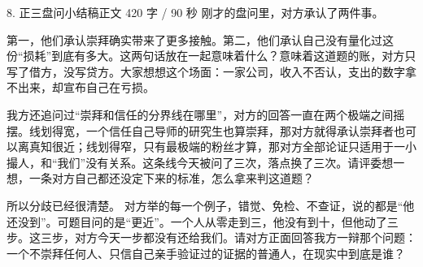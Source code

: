 \documentclass[script,pro]{debate}
\begin{document}
\begin{speech}{8. 正三盘问小结稿}{正文 420 字 / 90 秒}
刚才的盘问里，对方承认了两件事。

第一，他们承认崇拜确实带来了更多接触。第二，他们承认自己没有量化过这份“损耗”到底有多大。这两句话放在一起意味着什么？意味着这道题的账，对方只写了借方，没写贷方。大家想想这个场面：一家公司，收入不否认，支出的数字拿不出来，却宣布自己在亏损。

我方还追问过“崇拜和信任的分界线在哪里”，对方的回答一直在两个极端之间摇摆。线划得宽，一个信任自己导师的研究生也算崇拜，那对方就得承认崇拜者也可以离真知很近；线划得窄，只有最极端的粉丝才算，那对方全部论证只适用于一小撮人，和“我们”没有关系。这条线今天被问了三次，落点换了三次。请评委想一想，一条对方自己都还没定下来的标准，怎么拿来判这道题？

所以分歧已经很清楚。 对方举的每一个例子，错觉、免检、不查证，说的都是“他还没到”。可题目问的是“更近”。一个人从零走到三，他没有到十，但他动了三步。这三步，对方今天一步都没有还给我们。请对方正面回答我方一辩那个问题：一个不崇拜任何人、只信自己亲手验证过的证据的普通人，在现实中到底是谁？

\end{speech}
\end{document}
